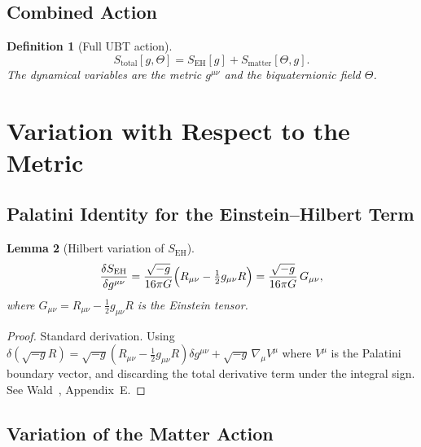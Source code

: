 \documentclass[12pt]{article}
\newtheorem{definition}{Definition}[section]
\newtheorem{lemma}[definition]{Lemma}
\begin{document}
\subsection{Combined Action}

\begin{definition}[Full UBT action]
\label{def:S_total}
\begin{equation}
  \label{eq:S_total}
  S_{\mathrm{total}}[g, \Theta]
  = S_{\mathrm{EH}}[g] + S_{\mathrm{matter}}[\Theta, g].
\end{equation}
The dynamical variables are the metric $g^{\mu\nu}$ and the biquaternionic
field $\Theta$.
\end{definition}

\section{Variation with Respect to the Metric}

\subsection{Palatini Identity for the Einstein--Hilbert Term}

\begin{lemma}[Hilbert variation of $S_{\mathrm{EH}}$]
\label{lem:EH_var}
\begin{equation}
  \label{eq:var_EH}
  \frac{\delta S_{\mathrm{EH}}}{\delta g^{\mu\nu}}
  = \frac{\sqrt{-g}}{16\pi G}
    \Bigl(R_{\mu\nu} - \tfrac{1}{2}g_{\mu\nu}R\Bigr)
  = \frac{\sqrt{-g}}{16\pi G}\,G_{\mu\nu},
\end{equation}
where $G_{\mu\nu} = R_{\mu\nu} - \tfrac{1}{2}g_{\mu\nu}R$ is the Einstein tensor.
\end{lemma}

\begin{proof}
  Standard derivation.  Using $\delta(\sqrt{-g}R) = \sqrt{-g}
  (R_{\mu\nu} - \tfrac{1}{2}g_{\mu\nu}R)\delta g^{\mu\nu}
  + \sqrt{-g}\,\nabla_\mu V^\mu$ where $V^\mu$ is the Palatini boundary
  vector, and discarding the total derivative term under the integral sign.
  See Wald~\cite{wald}, Appendix~E.
\end{proof}

\subsection{Variation of the Matter Action}
\end{document}

